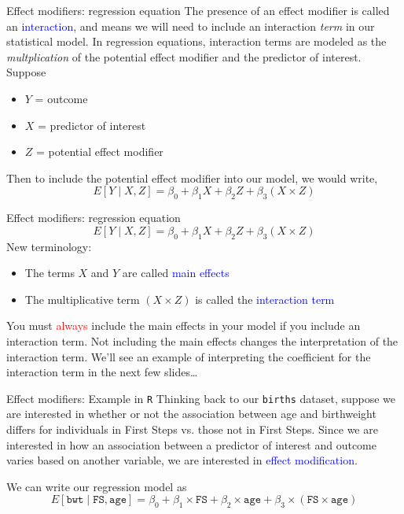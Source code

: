 \documentclass[10pt,t]{beamer}
\begin{document}
\begin{frame}{Effect modifiers: regression equation}
The presence of an effect modifier is called an \textcolor{blue}{interaction}, and means we will need to include an interaction \textit{term} in our statistical model. In regression equations, interaction terms are modeled as the \textit{multplication} of the potential effect modifier and the predictor of interest. Suppose
\vspace{0.3cm}

\begin{itemize}
	\item $Y$ = outcome
	\item $X$ = predictor of interest
	\item $Z$ = potential effect modifier
\end{itemize}

\vspace{0.3cm}

Then to include the potential effect modifier into our model, we would write,
$$
E[Y \mid X, Z] = \beta_0 + \beta_1 X + \beta_2 Z + \beta_3 (X \times Z)
$$
\end{frame}

\begin{frame}{Effect modifiers: regression equation}
\vspace{-0.5cm}
$$
E[Y \mid X, Z] = \beta_0 + \beta_1 X + \beta_2 Z + \beta_3 (X \times Z)
$$
New terminology:
\begin{itemize}
	\item The terms $X$ and $Y$ are called \textcolor{blue}{main effects}
	\item The multiplicative term $(X \times Z)$ is called the \textcolor{blue}{interaction term}
\end{itemize}

\vspace{0.3cm}

You must \textcolor{red}{always} include the main effects in your model if you include an interaction term. Not including the main effects changes the interpretation of the interaction term. We'll see an example of interpreting the coefficient for the interaction term in the next few slides\dots

\end{frame}

\begin{frame}{Effect modifiers: Example in \texttt{R}}
Thinking back to our \texttt{births} dataset, suppose we are interested in whether or not the association between age and birthweight differs for individuals in First Steps vs. those not in First Steps. Since we are interested in how an association between a predictor of interest and outcome varies based on another variable, we are interested in \textcolor{blue}{effect modification}. \pause

\vspace{0.3cm}

We can write our regression model as 
$$
E[\texttt{bwt} \mid \texttt{FS}, \texttt{age}] = \beta_0 + \beta_1 \times \texttt{FS} + \beta_2 \times \texttt{age} + \beta_3 \times (\texttt{FS} \times \texttt{age})
$$

\end{frame}
\end{document}

